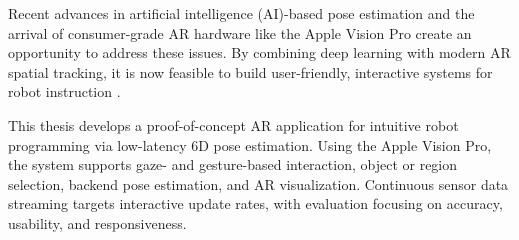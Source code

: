 Recent advances in artificial intelligence (AI)-based pose estimation and the arrival of consumer-grade AR hardware like the Apple Vision Pro create an opportunity to address these issues. By combining deep learning with modern AR spatial tracking, it is now feasible to build user-friendly, interactive systems for robot instruction \cite{lotsaris2021ar,wen2024foundationpose}.

This thesis develops a proof-of-concept AR application for intuitive robot programming via low-latency 6D pose estimation. Using the Apple Vision Pro, the system supports gaze- and gesture-based interaction, object or region selection, backend pose estimation, and AR visualization. Continuous sensor data streaming targets interactive update rates, with evaluation focusing on accuracy, usability, and responsiveness.

